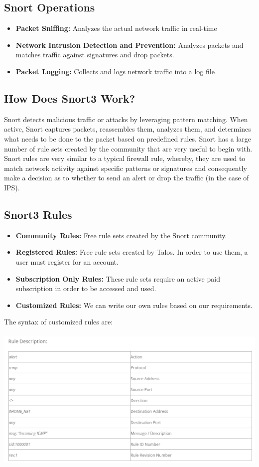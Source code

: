 \documentclass{article}
\begin{document}
\subsection{ Snort Operations}
\begin{itemize}
  \item \textbf{Packet Sniffing:} Analyzes the actual network traffic in real-time
  \item  \textbf{Network Intrusion Detection and Prevention:} Analyzes packets and matches traffic against signatures and drop packets.
  \item \textbf{Packet Logging:} Collects and logs network traffic into a log file
\end{itemize}

\subsection{How Does Snort3 Work?}
 Snort detects malicious traffic or attacks by leveraging pattern matching. When active,
 Snort captures packets, reassembles them, analyzes them, and determines what needs
 to be done to the packet based on predefined rules.
 Snort has a large number of rule sets created by the community that are very useful
 to begin with. Snort rules are very similar to a typical firewall rule, whereby, they are
 used to match network activity against specific patterns or signatures and consequently
 make a decision as to whether to send an alert or drop the traffic (in the case of IPS).

 \subsection{Snort3 Rules}
 \begin{itemize}
  \item \textbf{Community Rules:} Free rule sets created by the Snort community.
  \item  \textbf{Registered Rules:} Free rule sets created by Talos. In order to use them, a user must register for an account.
  \item \textbf{Subscription Only Rules:} These rule sets require an active paid subscription
 in order to be accessed and used.
  \item \textbf{Customized Rules:} We can write our own rules based on our requirements.
\end{itemize}
The syntax of customized rules are: \\\\
\includegraphics[width=1.0\textwidth]{images/snort_rule.png} 
\clearpage
\end{document}
